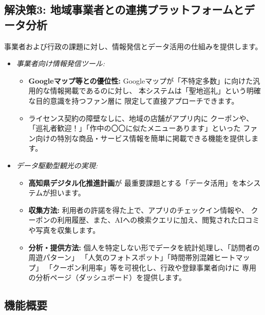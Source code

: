 \documentclass{docs}
\begin{document}
\subsection{解決策3: 地域事業者との連携プラットフォームとデータ分析}
事業者および行政の課題に対し、情報発信とデータ活用の仕組みを提供します。
\begin{itemize}
	\item \emph{事業者向け情報発信ツール:}
	\begin{itemize}
		\item \textbf{Googleマップ等との優位性:}
		Googleマップが「不特定多数」に向けた汎用的な情報掲載であるのに対し、
		本システムは「聖地巡礼」という明確な目的意識を持つファン層に
		限定して直接アプローチできます。
		\item ライセンス契約\cite{nri2024}の障壁なしに、地域の店舗がアプリ内に
		クーポンや、「巡礼者歓迎！」「作中の〇〇に似たメニューあります」といった
		ファン向けの特別な商品・サービス情報を簡単に掲載できる機能を提供します。
	\end{itemize}
	\item \emph{データ駆動型観光の実現:}
	\begin{itemize}
		\item \textbf{高知県デジタル化推進計画\cite{kochi_dx_plan}}が
		最重要課題とする「データ活用」を本システムが担います。
		\item \textbf{収集方法:}
		利用者の許諾を得た上で、アプリのチェックイン情報や、
		クーポンの利用履歴、また、AIへの検索クエリに加え、閲覧された口コミや写真を収集します。
		\item \textbf{分析・提供方法:}
		個人を特定しない形でデータを統計処理し、「訪問者の周遊パターン」
		「人気のフォトスポット」「時間帯別混雑ヒートマップ」
		「クーポン利用率」等を可視化し、行政や登録事業者向けに
		専用の分析ページ（ダッシュボード）を提供します。
	\end{itemize}
\end{itemize}

\subsection{機能概要}
\end{document}
